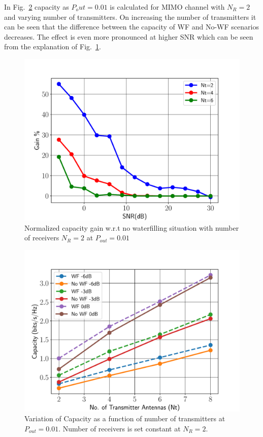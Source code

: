 \documentclass[11pt,a4paper]{report}
\def\imwidth{0.60}
\begin{document}
In Fig.~\ref{fig:cap_vs_trans} capacity as $P_out=0.01$ is calculated for MIMO channel
with $N_R=2$ and varying number of transmitters. On increasing the number of transmitters
it can be seen that the difference between the capacity of WF and No-WF scenarios decreases.
The effect is even more pronounced at higher SNR which can be seen from the explanation
of Fig.~\ref{fig:cap_gain}.

\begin{figure}
\begin{center}
\includegraphics[width=\imwidth\columnwidth]{images/cap_gain.pdf}
\caption{Normalized capacity gain w.r.t no waterfilling situation with number
of receivers $N_R=2$ at $P_{out}=0.01$}
\label{fig:cap_gain}
\end{center}
\end{figure}

\begin{figure}
\begin{center}
\includegraphics[width=\imwidth\columnwidth]{images/cap_vs_trans.pdf}
\caption{Variation of Capacity as a function of number of transmitters
    at $P_{out}=0.01$. Number of receivers is set constant at $N_R=2$.}
\label{fig:cap_vs_trans}
\end{center}
\end{figure}
\end{document}
